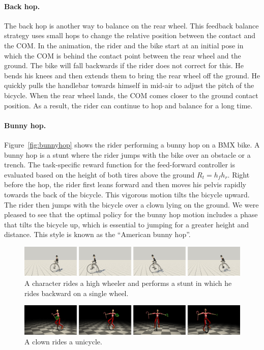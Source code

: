 \paragraph {Back hop.} The back hop is another way to balance on the rear wheel. This feedback balance strategy uses small hops to change the relative position between the contact and the COM. In the animation, the rider and the bike start at an initial pose in which the COM is behind the contact point between the rear wheel and the ground. The bike will fall backwards if the rider does not correct for this. He bends his knees and then extends them to bring the rear wheel off the ground. He quickly pulls the handlebar towards himself in mid-air to adjust the pitch of the bicycle. When the rear wheel lands, the COM comes closer to the ground contact position. As a result, the rider can continue to hop and balance for a long time.

\paragraph{Bunny hop.} Figure~\ref{fig:bunnyhop} shows the rider performing a bunny hop on a BMX bike. A bunny hop is a stunt where the rider jumps with the bike over an obstacle or a trench. The task-specific reward function for the feed-forward controller is evaluated based on the height of both tires above the ground $R_t=h_fh_r$. Right before the hop, the rider first leans forward and then moves his pelvis rapidly towards the back of the bicycle. This vigorous motion tilts the bicycle upward. The rider then jumps with the bicycle over a clown lying on the ground. We were pleased to see that the optimal policy for the bunny hop motion includes a phase that tilts the bicycle up, which is essential to jumping for a greater height and distance. This style is known as the ``American bunny hop''.

\begin{figure}[t]
\centering
\includegraphics[width=\textwidth]{figures/velocipede}
\caption{A character rides a high wheeler and performs a stunt in which he rides backward on a single wheel.}
\label{fig:highwheeler}
\end{figure}

\begin{figure}[t]
\centering
\includegraphics[width=\textwidth]{figures/unicycle}
\caption{A clown rides a unicycle.}
\label{fig:unicycle}
\end{figure}

